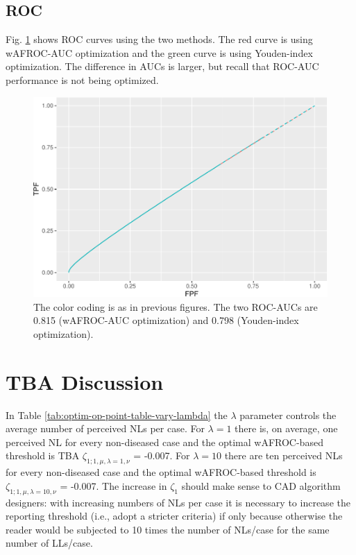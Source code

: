 \documentclass[
]{book}
\begin{document}
\hypertarget{roc-2}{%
\subsection{ROC}\label{roc-2}}

Fig. \ref{fig:optim-op-point-application-roc} shows ROC curves using the two methods. The red curve is using wAFROC-AUC optimization and the green curve is using Youden-index optimization. The difference in AUCs is larger, but recall that ROC-AUC performance is not being optimized.

\begin{figure}
\centering
\includegraphics{21-optim-op-point_files/figure-latex/optim-op-point-application-roc-1.pdf}
\caption{\label{fig:optim-op-point-application-roc}The color coding is as in previous figures. The two ROC-AUCs are 0.815 (wAFROC-AUC optimization) and 0.798 (Youden-index optimization).}
\end{figure}

\hypertarget{optim-op-point-discussion}{%
\section{TBA Discussion}\label{optim-op-point-discussion}}

In Table \ref{tab:optim-op-point-table-vary-lambda} the \(\lambda\) parameter controls the average number of perceived NLs per case. For \(\lambda = 1\) there is, on average, one perceived NL for every non-diseased case and the optimal wAFROC-based threshold is TBA \(\zeta_{1;1,\mu, \lambda = 1, \nu}\) = -0.007. For \(\lambda = 10\) there are ten perceived NLs for every non-diseased case and the optimal wAFROC-based threshold is \(\zeta_{1;1,\mu, \lambda = 10, \nu}\) = -0.007. The increase in \(\zeta_1\) should make sense to CAD algorithm designers: with increasing numbers of NLs per case it is necessary to increase the reporting threshold (i.e., adopt a stricter criteria) if only because otherwise the reader would be subjected to 10 times the number of NLs/case for the same number of LLs/case.
\end{document}
